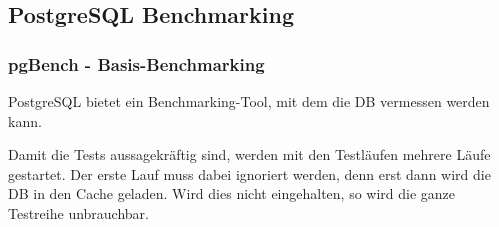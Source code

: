 
\begin{flushleft}
    \subsection{PostgreSQL Benchmarking}
    \subsubsection{pgBench - Basis-Benchmarking}
    PostgreSQL bietet ein Benchmarking-Tool\cite{TYJFF7AB,VXNYQFTE}, mit dem die DB vermessen werden kann.
\end{flushleft}
\begin{flushleft}
    Damit die Tests aussagekräftig sind, werden mit den Testläufen mehrere Läufe gestartet.
    Der erste Lauf muss dabei ignoriert werden, denn erst dann wird die DB in den Cache geladen.
    Wird dies nicht eingehalten, so wird die ganze Testreihe unbrauchbar.
\end{flushleft}
